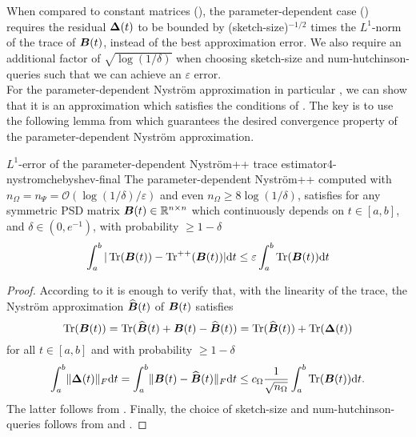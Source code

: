 When compared to constant matrices (),
the parameter-dependent case ()
requires the residual $\boldsymbol{\Delta}(t)$ to be bounded by
(\gls{sketch-size})$^{-1/2}$ times the $L^1$-norm of the
trace of $\boldsymbol{B}(t)$, instead of the best approximation error.
We also require an additional factor of $\sqrt{\log(1/\delta)}$ when choosing
\gls{sketch-size} and \gls{num-hutchinson-queries} such that we can achieve
an $\varepsilon$ error.\\

For the parameter-dependent Nystr\"om approximation in particular ,
we can show that it is an approximation which satisfies the conditions
of . The key is to use the following
lemma from \cite{he2023parameter} which guarantees the desired
convergence property of the parameter-dependent Nystr\"om approximation.

\begin{theorem}{$L^1$-error of the parameter-dependent Nystr\"om++ trace estimator}{4-nystromchebyshev-final}
    The parameter-dependent Nystr\"om++ computed with
    $n_{\Omega} = n_{\Psi} = \mathcal{O}\left( \log(1/\delta) / \varepsilon \right)$
    and even $n_{\Omega} \geq 8 \log(1/\delta)$,
    satisfies for any symmetric \gls{PSD} matrix $\boldsymbol{B}(t) \in \mathbb{R}^{n \times n}$ which continuously
    depends on $t \in [a, b]$, and $\delta \in (0, e^{-1})$, with probability
    $\geq 1 - \delta$
    \begin{equation}
        \int_{a}^{b} |\operatorname{Tr}(\boldsymbol{B}(t)) - \operatorname{Tr}^{++}(\boldsymbol{B}(t))| \mathrm{d}t \leq \varepsilon \int_{a}^{b}\operatorname{Tr}(\boldsymbol{B}(t)) \mathrm{d}t
    \end{equation}
\end{theorem}

\begin{proof}
    According to 
    it is enough to verify that, with the linearity of the trace, the Nystr\"om
    approximation $\widehat{\boldsymbol{B}}(t)$ of $\boldsymbol{B}(t)$ satisfies 
    \begin{equation}
        \operatorname{Tr}(\boldsymbol{B}(t)) = \operatorname{Tr}(\widehat{\boldsymbol{B}}(t) + \boldsymbol{B}(t) - \widehat{\boldsymbol{B}}(t)) = \operatorname{Tr}(\widehat{\boldsymbol{B}}(t)) + \operatorname{Tr}(\boldsymbol{\Delta}(t))
    \end{equation}
    for all $t \in [a, b]$ and with probability $\geq 1 - \delta$
    \begin{equation}
        \int_{a}^{b} \lVert \boldsymbol{\Delta}(t) \rVert _F \mathrm{d}t = \int_{a}^{b} \lVert \boldsymbol{B}(t) - \widehat{\boldsymbol{B}}(t) \rVert _F \mathrm{d}t \leq c_{\Omega} \frac{1}{\sqrt{n_{\Omega}}} \int_{a}^{b} \operatorname{Tr}(\boldsymbol{B}(t)) \mathrm{d}t.
    \end{equation}
    The latter follows from . Finally,
    the choice of \gls{sketch-size} and \gls{num-hutchinson-queries} follows
    from 
    and .
\end{proof}

